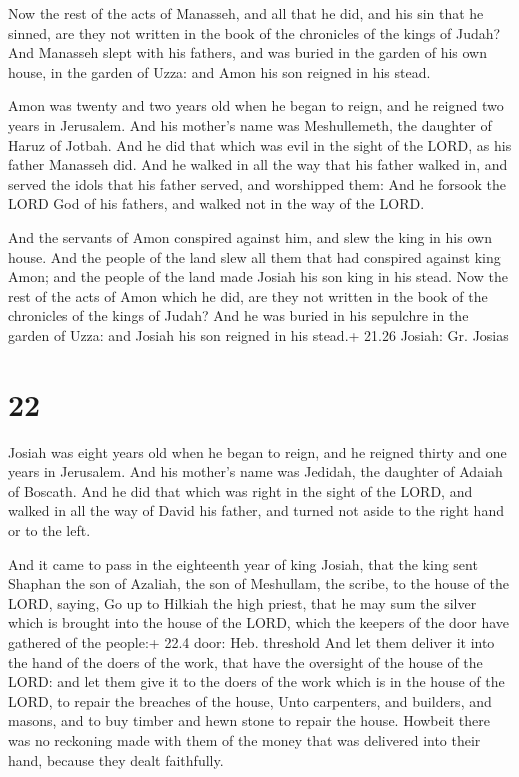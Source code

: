  Now the rest of the acts of Manasseh, and all that he
did, and his sin that he sinned, are they not written in the book of the
chronicles of the kings of Judah?  And Manasseh slept with
his fathers, and was buried in the garden of his own house, in the
garden of Uzza: and Amon his son reigned in his stead.

 Amon was twenty and two years old when he began to
reign, and he reigned two years in Jerusalem. And his mother's name was
Meshullemeth, the daughter of Haruz of Jotbah.  And he did
that which was evil in the sight of the LORD, as his father Manasseh
did.  And he walked in all the way that his father walked
in, and served the idols that his father served, and worshipped them:
 And he forsook the LORD God of his fathers, and walked not
in the way of the LORD.

 And the servants of Amon conspired against him, and slew
the king in his own house.  And the people of the land slew
all them that had conspired against king Amon; and the people of the
land made Josiah his son king in his stead.  Now the rest
of the acts of Amon which he did, are they not written in the book of
the chronicles of the kings of Judah?  And he was buried in
his sepulchre in the garden of Uzza: and Josiah his son reigned in his
stead.+ 21.26 Josiah: Gr. Josias

\hypertarget{section-21}{%
\section{22}\label{section-21}}

 Josiah was eight years old when he began to reign, and he
reigned thirty and one years in Jerusalem. And his mother's name was
Jedidah, the daughter of Adaiah of Boscath.  And he did that
which was right in the sight of the LORD, and walked in all the way of
David his father, and turned not aside to the right hand or to the left.

 And it came to pass in the eighteenth year of king
Josiah, that the king sent Shaphan the son of Azaliah, the son of
Meshullam, the scribe, to the house of the LORD, saying,  Go
up to Hilkiah the high priest, that he may sum the silver which is
brought into the house of the LORD, which the keepers of the door have
gathered of the people:+ 22.4 door: Heb. threshold  And let
them deliver it into the hand of the doers of the work, that have the
oversight of the house of the LORD: and let them give it to the doers of
the work which is in the house of the LORD, to repair the breaches of
the house,  Unto carpenters, and builders, and masons, and
to buy timber and hewn stone to repair the house.  Howbeit
there was no reckoning made with them of the money that was delivered
into their hand, because they dealt faithfully.

